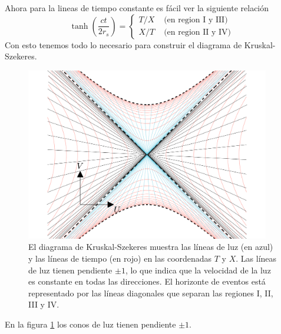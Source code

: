 \noindent Ahora para la lineas de tiempo constante es fácil ver la siguiente relación
\begin{equation}
    \tanh \left(\frac{ct}{2 r_s}\right)=\left\{\begin{array}{ll}
        T / X & \text { (en region I y III) } \\
        X / T & \text { (en region II y IV) }
    \end{array}\right.
\end{equation}
Con esto tenemos todo lo necesario para construir el diagrama de Kruskal-Szekeres.
\begin{figure}[H]
    \begin{small}
        \begin{center}
            \includegraphics[width=0.95\textwidth]{AgujerosNegros/Schwarzschild/media/images/Kruskal_Szekeres_diagram_ManimCE_v0.19.0.png}
        \end{center}
        \caption{El diagrama de Kruskal-Szekeres muestra las líneas de luz (en azul) y las líneas de tiempo (en rojo) en las coordenadas \(T\) y \(X\). Las líneas de luz tienen pendiente \(\pm 1\), lo que indica que la velocidad de la luz es constante en todas las direcciones. El horizonte de eventos está representado por las líneas diagonales que separan las regiones I, II, III y IV.}
        \label{fig:Kruskal_Szekeres_diagram}
    \end{small}
\end{figure}
En la figura \ref{fig:Kruskal_Szekeres_diagram} los conos de luz tienen pendiente \(\pm 1\).




